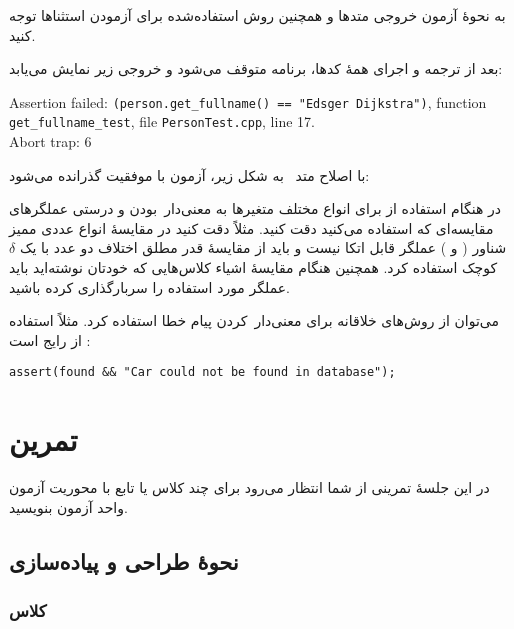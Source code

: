 \documentclass{utap}
\begin{document}
    به نحوهٔ آزمون خروجی متدها و همچنین روش استفاده‌شده برای آزمودن استثناها توجه کنید.

    بعد از ترجمه و اجرای همهٔ  کدها، برنامه متوقف می‌شود و خروجی زیر نمایش می‌یابد:
    \begin{latin}\footnotesize\noindent
    Assertion failed: \lstinline{(person.get_fullname() == "Edsger Dijkstra")}, function \lstinline{get_fullname_test}, file \lstinline{PersonTest.cpp}, line 17.\\
    Abort trap: 6
    \end{latin}

    با اصلاح متد  به شکل زیر، آزمون با موفقیت گذرانده می‌شود:
    \begin{latin}\end{latin}

    در هنگام استفاده از  برای انواع مختلف متغیرها به معنی‌دار~بودن و درستی عملگرهای مقایسه‌ای که استفاده می‌کنید دقت کنید. مثلاً دقت کنید در مقایسهٔ انواع عددی ممیز شناور ( و ) عملگر \lr{\lstinline{==}} قابل اتکا نیست و باید از مقایسهٔ قدر مطلق اختلاف دو عدد با یک $\delta$ کوچک استفاده کرد. همچنین هنگام مقایسهٔ اشیاء کلاس‌هایی که خودتان نوشته‌اید باید عملگر مورد استفاده را سربارگذاری کرده باشید.

    می‌توان از روش‌های خلاقانه برای معنی‌دار~کردن پیام خطا استفاده کرد. مثلاً  استفاده از  رایج است \cite{alex17}:
    \begin{latin}\begin{lstlisting}
assert(found && "Car could not be found in database");
    \end{lstlisting}\end{latin}

    \section{تمرین}

    در این جلسهٔ تمرینی از شما انتظار می‌رود برای چند کلاس یا تابع با محوریت آزمون واحد آزمون بنویسید.

    \subsection{نحوهٔ طراحی و پیاده‌سازی}

    \subsubsection[کلاس Triangle]{کلاس }
\end{document}
